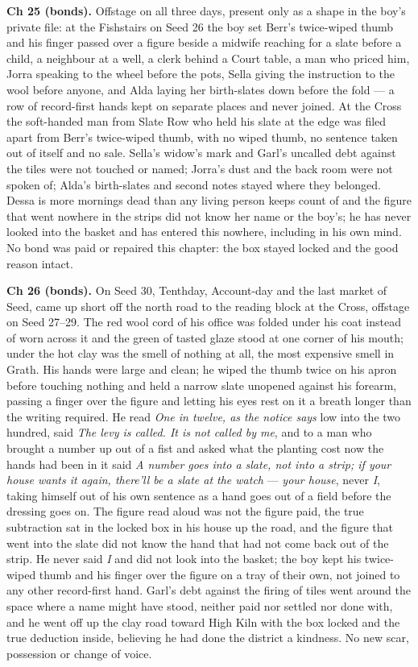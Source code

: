 \documentclass{design/chronicle}
\begin{document}
{\textbf{Ch 25 (bonds).} Offstage on all three days, present only as a shape in the boy’s private file: at the Fishstairs on Seed 26 the boy set Berr’s twice-wiped thumb and his finger passed over a figure beside a midwife reaching for a slate before a child, a neighbour at a well, a clerk behind a Court table, a man who priced him, Jorra speaking to the wheel before the pots, Sella giving the instruction to the wool before anyone, and Alda laying her birth-slates down before the fold — a row of record-first hands kept on separate places and never joined. At the Cross the soft-handed man from Slate Row who held his slate at the edge was filed apart from Berr’s twice-wiped thumb, with no wiped thumb, no sentence taken out of itself and no sale. Sella’s widow’s mark and Garl’s uncalled debt against the tiles were not touched or named; Jorra’s dust and the back room were not spoken of; Alda’s birth-slates and second notes stayed where they belonged. Dessa is more mornings dead than any living person keeps count of and the figure that went nowhere in the strips did not know her name or the boy’s; he has never looked into the basket and has entered this nowhere, including in his own mind. No bond was paid or repaired this chapter: the box stayed locked and the good reason intact.

\textbf{Ch 26 (bonds).} On Seed 30, Tenthday, Account-day and the last market of Seed, came up short off the north road to the reading block at the Cross, offstage on Seed 27–29. The red wool cord of his office was folded under his coat instead of worn across it and the green of tasted glaze stood at one corner of his mouth; under the hot clay was the smell of nothing at all, the most expensive smell in Grath. His hands were large and clean; he wiped the thumb twice on his apron before touching nothing and held a narrow slate unopened against his forearm, passing a finger over the figure and letting his eyes rest on it a breath longer than the writing required. He read \emph{One in twelve, as the notice says} low into the two hundred, said \emph{The levy is called. It is not called by me}, and to a man who brought a number up out of a fist and asked what the planting cost now the hands had been in it said \emph{A number goes into a slate, not into a strip; if your house wants it again, there’ll be a slate at the watch} — \emph{your house}, never \emph{I}, taking himself out of his own sentence as a hand goes out of a field before the dressing goes on. The figure read aloud was not the figure paid, the true subtraction sat in the locked box in his house up the road, and the figure that went into the slate did not know the hand that had not come back out of the strip. He never said \emph{I} and did not look into the basket; the boy kept his twice-wiped thumb and his finger over the figure on a tray of their own, not joined to any other record-first hand. Garl’s debt against the firing of tiles went around the space where a name might have stood, neither paid nor settled nor done with, and he went off up the clay road toward High Kiln with the box locked and the true deduction inside, believing he had done the district a kindness. No new scar, possession or change of voice.

}
\end{document}
